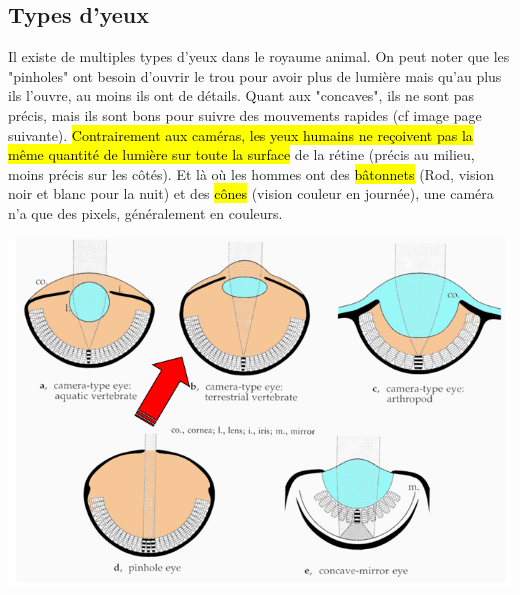 \documentclass[letterpaper, 12pt]{article}
\newcommand{\alinea}{
\hspace*{0.5cm}}
\begin{document}
	\subsection{Types d'yeux}
		\alinea Il existe de multiples types d'yeux dans le royaume animal. On peut noter que les "pinholes" ont besoin d'ouvrir
			le trou pour avoir plus de lumière mais qu'au plus ils l'ouvre, au moins ils ont de détails. Quant aux "concaves", 
			ils ne sont pas précis, mais ils sont bons pour suivre des mouvements rapides (cf image page suivante).
			\hl{Contrairement aux caméras, les yeux humains ne reçoivent pas la même quantité de lumière sur toute la surface} de
			la rétine (précis au milieu, moins précis sur les côtés). Et là où les hommes ont des \hl{bâtonnets} (Rod, vision noir et blanc
			pour la nuit) et des \hl{cônes} (vision couleur en journée), une caméra n'a que des pixels, généralement en couleurs.
		\begin{center}
			\includegraphics[width=5.5in]{Images/eyes}
		\end{center}
\end{document}
